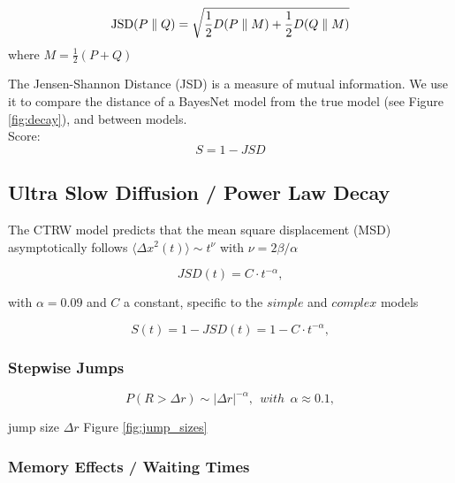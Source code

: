 \begin{equation}
{\rm JSD}(P \parallel Q)= \sqrt{\frac{1}{2}D(P \parallel M)+\frac{1}{2}D(Q \parallel M)}
\end{equation}
where $M=\frac{1}{2}(P+Q)$


The Jensen-Shannon Distance (JSD) is a measure of mutual information. We use it to compare the distance of a BayesNet model from the true model (see Figure \ref{fig:decay}), and between models.\\


Score:
\begin{equation}
S = 1 - JSD
\end{equation}



\subsection{Ultra Slow Diffusion / Power Law Decay}

The CTRW model predicts that the mean square displacement (MSD) asymptotically follows $\langle \Delta x^2 (t) \rangle \sim t^{\nu}$ with $\nu = 2\beta /\alpha$

\begin{equation}
\label{power_law_decay}
JSD(t) = C \cdot t^{-\alpha},
\end{equation}

with $\alpha = 0.09$ and $C$ a constant, specific to the $simple$ and $complex$ models

\begin{equation}
\label{ultraslowdiffusion}
S(t) = 1 - JSD(t) = 1- C \cdot t^{-\alpha},
\end{equation}


\subsubsection{Stepwise Jumps}

\begin{equation}
P(R > \Delta r) \sim |\Delta r|^{-\alpha}, ~~with~~\alpha \approx 0.1,
\end{equation}

jump size $\Delta r$ Figure \ref{fig:jump_sizes}



\subsubsection{Memory Effects / Waiting Times}

